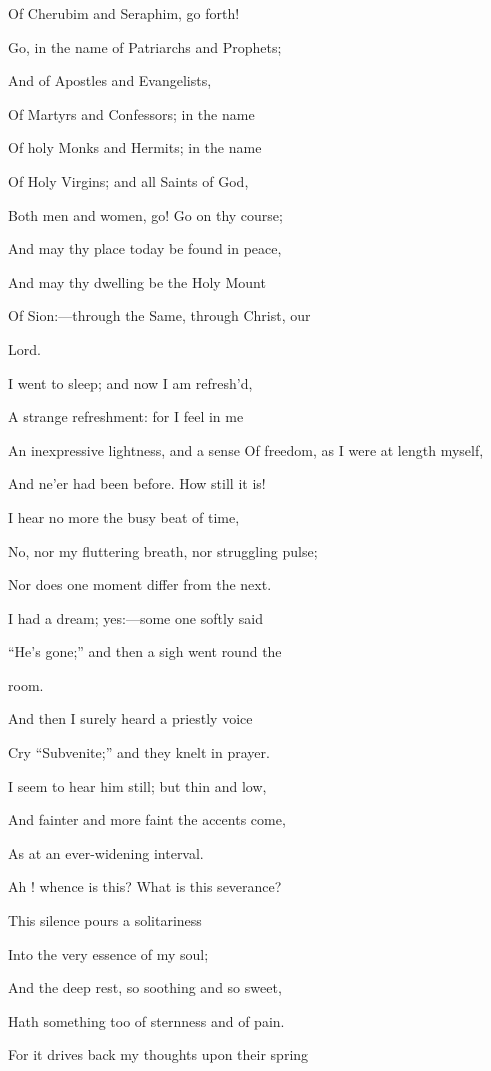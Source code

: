 Of Cherubim and Seraphim, go forth!

Go, in the name of Patriarchs and Prophets;

And of Apostles and Evangelists,

Of Martyrs and Confessors; in the name

Of holy Monks and Hermits; in the name

Of Holy Virgins; and all Saints of God,

Both men and women, go! Go on thy course;

And may thy place today be found in peace,

And may thy dwelling be the Holy Mount

Of Sion:—through the Same, through Christ, our

Lord.


I went to sleep; and now I am refresh'd,

A strange refreshment: for I feel in me

An inexpressive lightness, and a sense Of freedom, as I were at length myself,

And ne'er had been before. How still it is!

I hear no more the busy beat of time,

No, nor my fluttering breath, nor struggling pulse;

Nor does one moment differ from the next.

I had a dream; yes:—some one softly said

``He's gone;'' and then a sigh went round the

room.

And then I surely heard a priestly voice

Cry ``Subvenite;'' and they knelt in prayer.

I seem to hear him still; but thin and low,

And fainter and more faint the accents come,

As at an ever-widening interval.

Ah ! whence is this? What is this severance?

This silence pours a solitariness

Into the very essence of my soul;

And the deep rest, so soothing and so sweet,

Hath something too of sternness and of pain.

For it drives back my thoughts upon their spring

